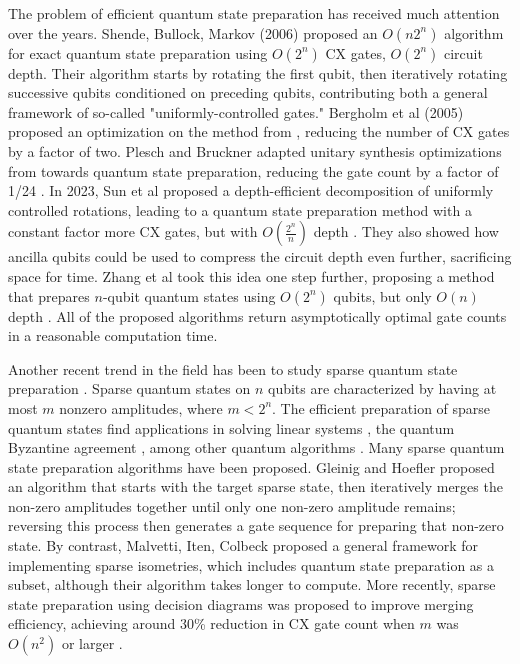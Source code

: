 \documentclass{article}
\begin{document}
The problem of efficient quantum state preparation has received much attention
over the years. Shende, Bullock, Markov (2006) \cite{1629135} proposed an $O(n2^n)$ algorithm
for exact quantum state preparation using $O(2^n)$ CX gates, $O(2^n)$ circuit
depth. Their algorithm starts by rotating the first qubit, then iteratively 
rotating successive qubits conditioned on preceding qubits, contributing both
a general framework of so-called "uniformly-controlled gates." Bergholm et al
(2005) \cite{bergholm2005quantum} proposed an optimization on the method from \cite{1629135}, reducing the number of
CX gates by a factor of two. Plesch and Bruckner adapted unitary 
synthesis optimizations from \cite{1629135} towards quantum state preparation,
reducing the gate count by a factor of 1/24 \cite{PhysRevA.83.032302}. In 2023, Sun et al proposed a 
depth-efficient decomposition of uniformly controlled rotations, leading to a 
quantum state preparation method with a constant factor more CX gates, but with
$O(\frac{2^n}{n})$ depth \cite{10044235}. They also showed how ancilla qubits could be used to
compress the circuit depth even further, sacrificing space for time. Zhang et al
took this idea one step further, proposing a method that prepares
$n$-qubit quantum states using $O(2^n)$ qubits, but only $O(n)$ depth \cite{zhang2022quantum}. All of
the proposed algorithms return asymptotically optimal gate counts in a
reasonable computation time.

Another recent trend in the field has been to study sparse quantum state
preparation \cite{PhysRevA.106.022617}. Sparse quantum states on $n$ qubits are characterized by having
at most $m$ nonzero amplitudes, where $m < 2^n$. The efficient
preparation of sparse quantum states find applications in solving linear
systems \cite{PhysRevLett.103.150502}, the quantum Byzantine agreement \cite{10.1145/1060590.1060662}, among other quantum algorithms \cite{9272350}.
Many sparse quantum state preparation algorithms have been proposed.
Gleinig and Hoefler \cite{10.1109/DAC18074.2021.9586240} proposed an algorithm that starts with the
target sparse state, then iteratively merges the non-zero amplitudes together
until only one non-zero amplitude remains; reversing this process then generates
a gate sequence for preparing that non-zero state. By contrast, Malvetti, Iten,
Colbeck \cite{Malvetti2021quantumcircuits} proposed a general framework for implementing sparse isometries, which
includes quantum state preparation as a subset, although their algorithm takes
longer to compute. More recently, sparse state preparation using decision
diagrams was proposed to improve merging efficiency, achieving around 30\%
reduction in CX gate count when $m$ was $O(n^2)$ or larger \cite{PhysRevA.106.022617}.
\end{document}
